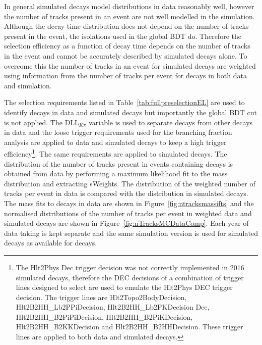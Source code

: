 In general simulated decays model distributions in data reasonably well, however the number of tracks present in an event are not well modelled in the simulation. %
Although the \bsmumu decay time distribution does not depend on the number of tracks present in the event, the isolations used in the global BDT do. Therefore the selection efficiency as a function of decay time depends on the number of tracks in the event and cannot be accurately described by simulated decays alone. To overcome this the number of tracks in an event for simulated \bsmumu decays are weighted using information from the number of tracks per event for \bdkpi decays in both data and simulation. 

The selection requirements listed in Table~\ref{tab:fullpreselectionEL} are used to identify \bdkpi decays in data and simulated decays but importantly the global BDT cut is not applied. The DLL$_{K\pi}$ variable is used to separate \bdkpi decays from other \bhh decays in data and the loose trigger requirements used for the branching fraction analysis are applied to data and simulated decays to keep a high trigger efficiency\footnote{The Hlt2Phys Dec trigger decision was not correctly implemented in 2016 simulated decays, therefore the DEC decisions of a combination of trigger lines designed to select \bhh are used to emulate the Hlt2Phys DEC trigger decision. The trigger lines are Hlt2Topo2BodyDecision, Hlt2B2HH\_Lb2PPiDecision, Hlt2B2HH\_Lb2PKDecision Dec, Hlt2B2HH\_B2PiPiDecision, Hlt2B2HH\_B2PiKDecision, Hlt2B2HH\_B2KKDecision and Hlt2B2HH\_B2HHDecision. These trigger lines are applied to both data and simulated decays.}. The same requirements are applied to simulated decays. The distribution of the number of tracks present in events containing \bdkpi decays is obtained from data by performing a maximum likelihood fit to the \bd mass distribution and extracting sWeights. The distribution of the weighted number of tracks per event in data is compared with the distribution in simulated \bdkpi decays. The mass fits to \bdkpi decays in data are shown in Figure~\ref{fig:ntracksmassifts} and the normalised distributions of the number of tracks per event in weighted data and simulated decays are shown in Figure~\ref{fig:nTracksMCDataComp}. Each year of data taking is kept separate and the same simulation version is used for \bdkpi simulated decays as available for \bsmumu decays.



